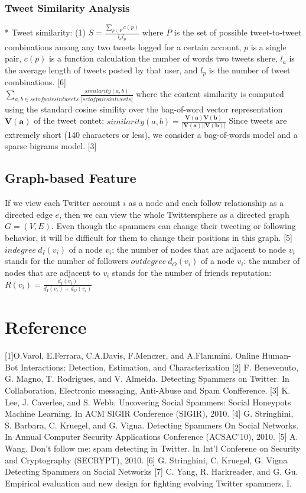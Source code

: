 \documentclass[a4paper, twoside, 12pt]{report}
\begin{document}
\subsubsection{Tweet Similarity Analysis}

* Tweet similarity: (1) $S=\frac{\sum_{p\in P}c(p)}{l_al_p}$ where $P$ is the set of possible tweet-to-tweet combinations among any two tweets logged for a certain account, $p$ is a single pair, $c(p)$ is a function calculation the number of words two tweets shere, $l_a$ is the average length of tweets posted by that user, and $l_p$ is the number of tweet combinations. [6]\\

\noindent * $\sum_{a,b \in set of pairs in tweets}\frac{similarity(a,b)}{|set of pairs in tweets|}$ where the content similarity is computed using the standard cosine simility over the bag-of-word vector representation $\mathbf{V(a)}$ of the tweet contet: $similarity(a,b)=\frac{\mathbf{V(a)}\mathbf{V(b)}}{|\mathbf{V(a)}||\mathbf{V(b)}|}$ Since tweets are extremely short (140 characters or less), we consider a bag-of-words model and a sparse bigrams model. [3]

\subsection{Graph-based Feature}

If we view each Twitter account $i$ as a node and each follow relationship as a directed edge $e$, then we can view the whole Twittersphere as a directed graph $G = (V, E)$. Even though the spammers can change their tweeting or following behavior, it will be difficult for them to change their positions in this graph. [5]\\

\noindent$indegree\ d_I(v_i)$ of a node $v_i$: the number of nodes that are adjacent to node $v_i$ stands for the number of followers
$outdegree\ d_O(v_i)$ of a node $v_i$: the number of nodes that are adjacent to $v_i$ stands for the number of friends
reputation: $R(v_i)=\frac{d_I(v_i)}{d_I(v_i)+d_O(v_i)}$

\section{Reference}
[1]O.Varol, E.Ferrara, C.A.Davis, F.Menczer, and A.Flammini. Online Human-Bot Interactions: Detection, Estimation, and Characterization
[2] F. Benevenuto, G. Magno, T. Rodrigues, and V. Almeida. Detecting Spammers on Twitter. In Collaboration, Electronic messaging, Anti-Abuse and Spam Confference.
[3] K. Lee, J. Caverlee, and S. Webb. Uncovering Social Spammers: Social Honeypots Machine Learning. In ACM SIGIR Conference (SIGIR), 2010.
[4] G. Stringhini, S. Barbara, C. Kruegel, and G. Vigna. Detecting Spammers On Social Networks. In Annual Computer Security Applications Conference (ACSAC’10), 2010.
[5] A. Wang. Don’t follow me: spam detecting in Twitter. In Int’l Conferene on Security and Cryptography (SECRYPT), 2010.
[6] G. Stringhini, C. Kruegel, G. Vigna Detecting Spammers on Social Networks
[7] C. Yang, R. Harkreader, and G. Gu. Empirical evaluation and new design for fighting evolving Twitter spammers. I.
\end{document}
